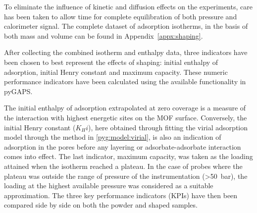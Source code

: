 To eliminate the influence of kinetic and diffusion effects on the experiments,
care has been taken to allow time for complete equilibration of both pressure
and calorimeter signal.
The complete dataset of adsorption isotherms, in the basis of both mass
and volume can be found in Appendix~\ref{appx:shaping}.

After collecting the combined isotherm and enthalpy data, three
indicators have been chosen to best represent the effects of shaping:
initial enthalpy of adsorption, initial Henry constant and maximum capacity.
These numeric performance indicators have been calculated using the
available functionality in pyGAPS.

The initial enthalpy of adsorption extrapolated at zero coverage is
a measure of the interaction with highest energetic sites on the MOF
surface. Conversely, the initial Henry constant (\(K_Hi\)), here obtained through fitting the virial adsorption model through the method in
\autoref{pyg:model:virial},
is also an indication of adsorption in the pores before any
layering or adsorbate-adsorbate interaction comes into effect.
The last indicator, maximum capacity, was taken as the loading attained when
the isotherm reached a plateau. In the case of probes where the plateau
was outside the range of pressure of the instrumentation (>\SI{50}{\bar}),
the loading at the highest available pressure was considered as a
suitable approximation.
The three key performance indicators (KPIs) have then been compared side by
side on both the powder and shaped samples.






